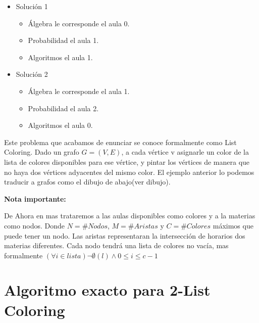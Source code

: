 \documentclass[a4paper]{article}
\begin{document}
\begin{itemize}
	\item Solución 1
	\begin{itemize}
		\item Álgebra le corresponde el aula 0.
		\item Probabilidad el aula 1.
		\item Algoritmos el aula 1.
	\end{itemize}
	\item Solución 2
		\begin{itemize}
		\item Álgebra le corresponde el aula 1.
		\item Probabilidad el aula 2.
		\item Algoritmos el aula 0.
	\end{itemize}
\end{itemize}	




Este problema que acabamos de enunciar se conoce formalmente como List Coloring. Dado un grafo $G = (V,E)$, a cada vértice v asignarle un color de la lista de colores disponibles para ese vértice, y pintar los vértices de manera que no haya dos vértices adyacentes del mismo color.
El ejemplo anterior lo podemos traducir a grafos como el dibujo de abajo(ver dibujo).
\newline

\textbf{Nota importante:}

De Ahora en mas trataremos a las aulas disponibles como colores y a la materias como nodos. Donde $N = \# Nodos$, $M= \# Aristas$ y $C= \# Colores$ máximos que puede tener un nodo.
Las aristas representaran la intersección de horarios dos materias diferentes. Cada nodo tendrá una lista de colores no vacía, mas formalmente $(\forall i \in lista) \neg \emptyset	( l) \land 0\leq i \leq c-1 $ 
 


\section{Algoritmo exacto para 2-List Coloring}

 
\end{document}
